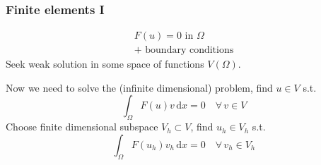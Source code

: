 \documentclass[presentation]{beamer}
\begin{document}
\begin{frame}
  \frametitle{Finite elements I}
  \begin{align*}
    F(u) = 0 \text{ in $\Omega$}\\
    \text{+ boundary conditions}
  \end{align*}
  Seek weak solution in some space of functions $V(\Omega)$.

  Now we need to solve the (infinite dimensional) problem, find $u\in V$ s.t.
  \begin{equation*}
    \int_\Omega \!F(u) v\, \text{d}x = 0 \quad \forall\, v \in V
  \end{equation*}
  Choose finite dimensional subspace $V_h \subset V$, find $u_h \in V_h$ s.t.
  \begin{equation*}
    \int_\Omega \!F(u_h) v_h\, \text{d}x = 0 \quad \forall\, v_h \in V_h
  \end{equation*}
\end{frame}
\end{document}

